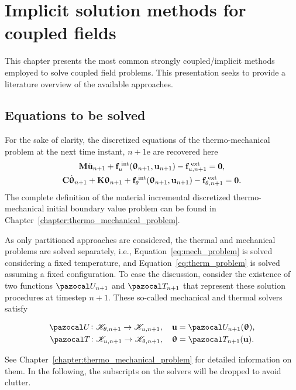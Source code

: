 \chapter {Implicit solution methods for coupled fields} \label{chapter:implicit_meth}

This chapter presents the most common strongly coupled/implicit methods employed to solve coupled field problems.
This presentation seeks to provide a literature overview of the available approaches.


\section{Equations to be solved}

For the sake of clarity, the discretized equations of the thermo-mechanical problem at the next time instant, \(n+1\)e are recovered here
\begin{gather}
    \mathbf M \ddot{\mathbf u}_{n+1} +\mathbf f_u^\text{\;int}(\bm \uptheta_{n+1}, \mathbf u_{n+1})-\mathbf f^\text{\;ext}_{u,n+1}=\mathbf 0, \label{eq:mech_problem} \\
    \mathbf C \dot{\bm \uptheta}_{n+1} + \mathbf K \bm \uptheta_{n+1} +\mathbf f_\theta^\text{\;int}(\bm \uptheta_{n+1}, \mathbf u_{n+1})-\mathbf f^\text{\;ext}_{\theta,n+1}=\mathbf 0. \label{eq:therm_problem}
\end{gather}
The complete definition of the material incremental discretized thermo-mechanical initial boundary value problem can be found in Chapter~\ref{chapter:thermo_mechanical_problem}.

As only partitioned approaches are considered, the thermal and mechanical problems are solved separately, i.e., Equation~\eqref{eq:mech_problem} is solved considering a fixed temperature, and Equation~\eqref{eq:therm_problem} is solved assuming a fixed configuration.
To ease the discussion, consider the existence of two functions \(\pazocal U_{n+1}\) and \(\pazocal T_{n+1}\) that represent these solution procedures at timestep \(n+1\).
These so-called mechanical and thermal solvers satisfy
\begin{highlight}[innertopmargin=-5pt]
\begin{gather}
  \pazocal U\colon \mathscr K_{\theta, n+1}\to \mathscr K_{u,n+1},\quad \mathbf u = \pazocal U_{n+1}(\bm \uptheta),\\
  \pazocal T\colon \mathscr K_{u,n+1}\to \mathscr K_{\theta, n+1},\quad \bm \uptheta = \pazocal T_{n+1}(\mathbf u).
\end{gather}
\end{highlight}
See Chapter~\ref{chapter:thermo_mechanical_problem} for detailed information on them.
In the following, the subscripts on the solvers will be dropped to avoid clutter.

